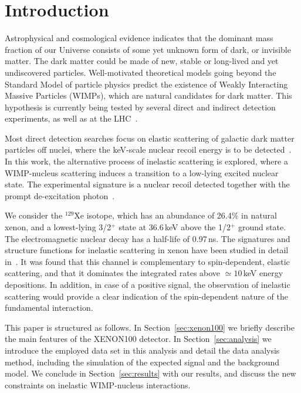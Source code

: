 \section{\label{sec:intro} Introduction}

Astrophysical and cosmological evidence indicates that the dominant mass fraction of our Universe consists of some yet unknown
form of dark, or invisible matter. The dark matter could be made of new, stable or long-lived and yet undiscovered particles. Well-motivated
theoretical models going beyond the Standard Model of particle physics predict the existence of Weakly Interacting Massive
Particles (WIMPs), which are natural candidates for dark matter. This hypothesis is currently being tested by several direct
and indirect detection experiments, as well as at the LHC~\cite{Bertone:2010zza,Baudis:2016qwx}.

Most direct detection searches focus on elastic scattering of galactic dark matter particles off nuclei, where the keV-scale 
nuclear recoil energy is to be detected~\cite{Baudis:2012ig,Undagoitia:2015gya,Baudis:2015mpa}. In this work, the 
alternative process of inelastic scattering is explored, where a WIMP-nucleus scattering induces a transition to a low-lying 
excited nuclear state. The experimental signature is a nuclear recoil detected together with the prompt de-excitation 
photon~\cite{Ellis:1988nb}. 

We consider the $^{129}\text{Xe}$ isotope, which has an abundance of 26.4\% in natural xenon, and a lowest-lying 
3/2$^{+}$ state at 36.6\,keV above the 1/2$^+$ ground state. The electromagnetic nuclear decay has a half-life of 0.97\,ns. 
The signatures and structure functions for inelastic scattering in xenon have been studied in detail in~\cite{Baudis:2013bba}. It was found that this channel is complementary to spin-dependent, elastic scattering, and that it dominates the integrated rates above $\simeq10$\,keV energy depositions. 
In addition, in case of a positive signal, the observation of inelastic scattering would provide a clear 
indication of the spin-dependent nature of the fundamental interaction. 

This paper is structured as follows.  In Section~\ref{sec:xenon100} we briefly describe the main features of the XENON100 detector.  In Section~\ref{sec:analysis} we introduce the employed data 
set in this analysis and detail the data analysis method, including the simulation of the expected signal and the 
background model. We conclude in Section~\ref{sec:results} with our results, and discuss the new constraints on inelastic WIMP-nucleus interactions.

